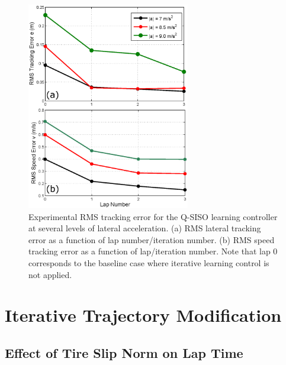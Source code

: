 \documentclass[9pt,shortpaper,twoside,web]{ieeecolor}
\begin{document}




\begin{figure}
\centering
\includegraphics[width=2.8in]{figures/expRes3.eps}
\caption[Experimental RMS tracking error for the Q-SISO learning controller at several levels of lateral acceleration. ]{Experimental RMS tracking error for the Q-SISO learning controller at several levels of lateral acceleration. (a) RMS lateral tracking
error as a function of lap number/iteration number. (b) RMS speed tracking error as a function of lap/iteration number. Note that lap 0 corresponds
to the baseline case where iterative learning control is not applied.}
\label{fig:expRes3}
\end{figure}

\section{Iterative Trajectory Modification}
\subsection{Effect of Tire Slip Norm on Lap Time}
\label{sec:etu}
\end{document}
